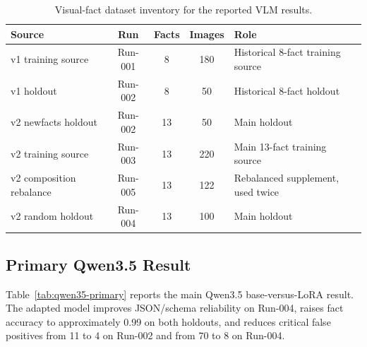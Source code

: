 \begin{table}[htbp]
\centering
\caption{Visual-fact dataset inventory for the reported VLM results.}
\label{tab:dataset-summary}
\small
\begin{tabular}{@{}lcccl@{}}
\toprule
\textbf{Source} & \textbf{Run} & \textbf{Facts} & \textbf{Images} & \textbf{Role} \\
\midrule
v1 training source & Run-001 & 8  & 180 & Historical 8-fact training source \\
v1 holdout & Run-002 & 8  & 50  & Historical 8-fact holdout \\
v2 newfacts holdout & Run-002 & 13 & 50  & Main holdout \\
v2 training source & Run-003 & 13 & 220 & Main 13-fact training source \\
v2 composition rebalance & Run-005 & 13 & 122 & Rebalanced supplement, used twice \\
v2 random holdout & Run-004 & 13 & 100 & Main holdout \\
\bottomrule
\end{tabular}
\end{table}

\subsection{Primary Qwen3.5 Result}

Table~\ref{tab:qwen35-primary} reports the main Qwen3.5 base-versus-LoRA
result. The adapted model improves JSON/schema reliability on Run-004, raises
fact accuracy to approximately 0.99 on both holdouts, and reduces critical
false positives from 11 to 4 on Run-002 and from 70 to 8 on Run-004.

